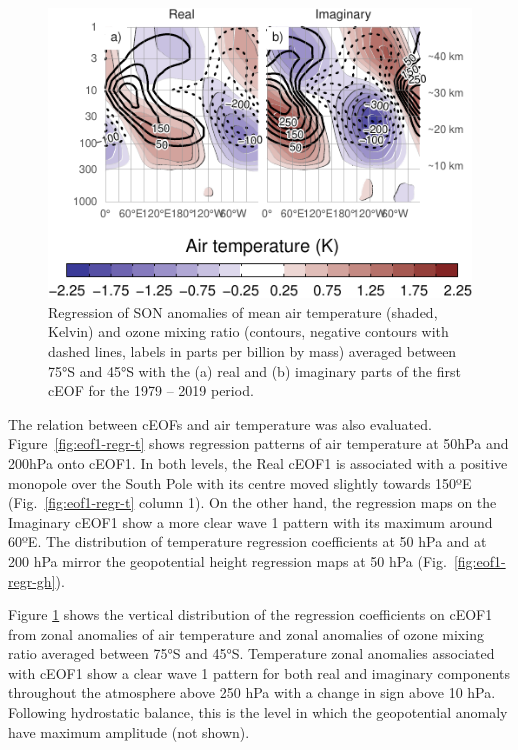 \documentclass[smallextended]{svjour3}       %
\begin{document}
\begin{figure}
\centering
\includegraphics{../figures/t-vertical-1.pdf}
\caption{\label{fig:t-vertical}Regression of SON anomalies of mean air temperature (shaded, Kelvin) and ozone mixing ratio (contours, negative contours with dashed lines, labels in parts per billion by mass) averaged between 75°S and 45°S with the (a) real and (b) imaginary parts of the first cEOF for the 1979 -- 2019 period.}
\end{figure}

The relation between cEOFs and air temperature was also evaluated.
Figure~\ref{fig:eof1-regr-t} shows regression patterns of air temperature at 50hPa and 200hPa onto cEOF1.
In both levels, the Real cEOF1 is associated with a positive monopole over the South Pole with its centre moved slightly towards 150ºE (Fig.~\ref{fig:eof1-regr-t} column 1).
On the other hand, the regression maps on the Imaginary cEOF1 show a more clear wave 1 pattern with its maximum around 60ºE.
The distribution of temperature regression coefficients at 50 hPa and at 200 hPa mirror the geopotential height regression maps at 50 hPa (Fig.~\ref{fig:eof1-regr-gh}).

Figure \ref{fig:t-vertical} shows the vertical distribution of the regression coefficients on cEOF1 from zonal anomalies of air temperature and zonal anomalies of ozone mixing ratio averaged between 75°S and 45°S.
Temperature zonal anomalies associated with cEOF1 show a clear wave 1 pattern for both real and imaginary components throughout the atmosphere above 250 hPa with a change in sign above 10 hPa.
Following hydrostatic balance, this is the level in which the geopotential anomaly have maximum amplitude (not shown).
\end{document}

